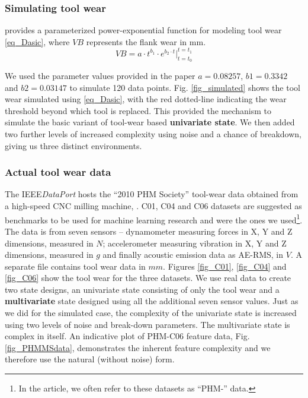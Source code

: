 \documentclass[referee, sn-mathphys-num]{sn-jnl}
\begin{document}
	\subsubsection*{Simulating tool wear}
	\cite{dasic2006} provides a parameterized power-exponential function for modeling tool wear \eqref{eq_Dasic}, where $VB$ represents the flank wear in mm.
	\begin{equation}
		VB = a \cdot t^{b_1} \cdot e^{b_2 \cdot t} \Big|_{t=t_0}^{t=t_1}
		\label{eq_Dasic}
	\end{equation}
	
	We used the parameter values provided in the paper $a=0.08257$, $b1=0.3342$ and $b2=0.03147$ to simulate 120 data points. Fig. \ref{fig_simulated} shows the tool wear simulated using \eqref{eq_Dasic}, with the red dotted-line indicating the wear threshold beyond which tool is replaced. This provided the mechanism to simulate the basic variant of tool-wear based \textbf{univariate state}. We then added two further levels of increased complexity using noise and a chance of breakdown, giving us three distinct environments. 
	
	\subsubsection*{Actual tool wear data}\label{sec_PHMdata}
	The IEEE\textit{DataPort} hosts the ``2010 PHM Society'' tool-wear data obtained from a high-speed CNC milling machine, \cite{PHM-dataset}. C01, C04 and C06 datasets are suggested as benchmarks to be used for machine learning research and were the ones we used\footnote{In the article, we often refer to these datasets as ``PHM-'' data.}. The data is from seven sensors -- dynamometer measuring forces in X, Y and Z dimensions, measured in $N$; accelerometer measuring vibration in X, Y and Z dimensions, measured in $g$ and finally acoustic emission data as AE-RMS, in $V$. A separate file contains tool wear data in $mm$. Figures \ref{fig_C01}, \ref{fig_C04} and \ref{fig_C06} show the tool wear for the three datasets. We use real data to create two state designs, an univariate state consisting of only the tool wear and a \textbf{multivariate} state designed using all the additional seven sensor values. Just as we did for the simulated case, the complexity of the univariate state is increased using two levels of noise and break-down parameters. The multivariate state is complex in itself. An indicative plot of PHM-C06 feature data, Fig. \ref{fig_PHMMSdata}, demonstrates the inherent feature complexity and we therefore use the natural (without noise) form.
	
\end{document}
